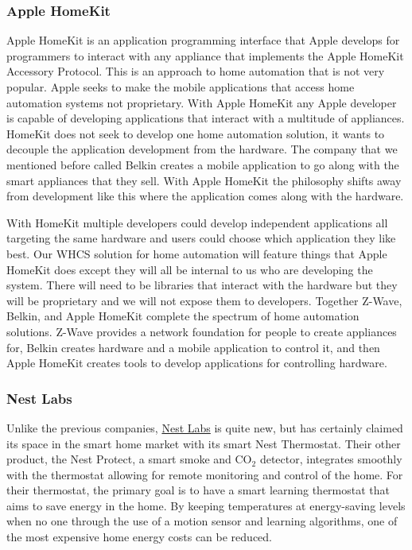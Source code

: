 \subsubsection{Apple HomeKit}

Apple HomeKit is an application programming interface that Apple develops for
programmers to interact with any appliance that implements the Apple HomeKit
Accessory Protocol. This is an approach to home automation that is not very
popular.  Apple seeks to make the mobile applications that access home
automation systems not proprietary. With Apple HomeKit any Apple developer is
capable of developing applications that interact with a multitude of
appliances. HomeKit does not seek to develop one home automation solution, it
wants to decouple the application development from the hardware. The company
that we mentioned before called Belkin creates a mobile application to go along
with the smart appliances that they sell. With Apple HomeKit the philosophy
shifts away from development like this where the application comes along with
the hardware.

With HomeKit multiple developers could develop independent applications all
targeting the same hardware and users could choose which application they like
best. Our WHCS solution for home automation will feature things that Apple
HomeKit does except they will all be internal to us who are developing the
system. There will need to be libraries that interact with the hardware but
they will be proprietary and we will not expose them to developers. Together
Z{}-Wave, Belkin, and Apple HomeKit complete the spectrum of home automation
solutions. Z{}-Wave provides a network foundation for people to create
appliances for, Belkin creates hardware and a mobile application to control it,
and then Apple HomeKit creates tools to develop applications for controlling
hardware.


\subsubsection{Nest Labs}
Unlike the previous companies, \href{http://nest.com}{Nest Labs} is quite new,
but has certainly claimed its space in the smart home market with its smart
Nest Thermostat. Their other product, the Nest Protect, a smart smoke and
CO$_2$ detector, integrates smoothly with the thermostat allowing for remote
monitoring and control of the home. For their thermostat, the primary goal is
to have a smart learning thermostat that aims to save energy in the home. By
keeping temperatures at energy-saving levels when no one through the use of a
motion sensor and learning algorithms, one of the most expensive home energy
costs can be reduced.


